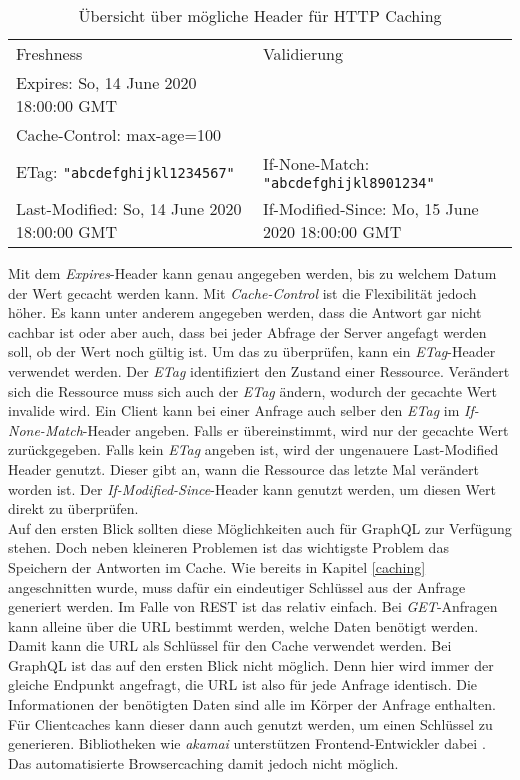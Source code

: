 \begin{table}
\begin{tabular}{p{6cm} p{6cm}}
Freshness & Validierung \\
Expires: So, 14 June 2020 18:00:00 GMT & \\
Cache-Control: max-age=100 &  \\
ETag: \verb+"abcdefghijkl1234567"+ & If-None-Match: \verb+"abcdefghijkl8901234"+\\
Last-Modified: So, 14 June 2020 18:00:00 GMT& If-Modified-Since: Mo, 15 June 2020 18:00:00 GMT\\
\end{tabular}
\caption{Übersicht über mögliche Header für HTTP Caching}
\label{tab:HTTPCaching}
\end{table}

Mit dem \textit{Expires}-Header kann genau angegeben werden, bis zu welchem Datum der Wert gecacht werden kann. Mit \textit{Cache-Control} ist die Flexibilität jedoch höher. Es kann unter anderem angegeben werden, dass die Antwort gar nicht cachbar ist oder aber auch, dass bei jeder Abfrage der Server angefagt werden soll, ob der Wert noch gültig ist. Um das zu überprüfen, kann ein \textit{ETag}-Header verwendet werden. Der \textit{ETag} identifiziert den Zustand einer Ressource. Verändert sich die Ressource muss sich auch der \textit{ETag} ändern, wodurch der gecachte Wert invalide wird. Ein Client kann bei einer Anfrage auch selber den \textit{ETag} im \textit{If-None-Match}-Header angeben. Falls er übereinstimmt, wird nur der gecachte Wert zurückgegeben. Falls kein \textit{ETag} angeben ist, wird der ungenauere Last-Modified Header genutzt. Dieser gibt an, wann die Ressource das letzte Mal verändert worden ist. Der \textit{If-Modified-Since}-Header kann genutzt werden, um diesen Wert direkt zu überprüfen.\\
Auf den ersten Blick sollten diese Möglichkeiten auch für GraphQL zur Verfügung stehen. Doch neben kleineren Problemen ist das wichtigste Problem das Speichern der Antworten im Cache. Wie bereits in Kapitel \ref{caching} angeschnitten wurde, muss dafür ein eindeutiger Schlüssel aus der Anfrage generiert werden. Im Falle von \ac{REST} ist das relativ einfach. Bei \textit{GET}-Anfragen kann alleine über die \ac{URL} bestimmt werden, welche Daten benötigt werden. Damit kann die \ac{URL} als Schlüssel für den Cache verwendet werden. Bei GraphQL ist das auf den ersten Blick nicht möglich. Denn hier wird immer der gleiche Endpunkt angefragt, die \ac{URL} ist also für jede Anfrage identisch. Die Informationen der benötigten Daten sind alle im Körper der Anfrage enthalten. Für Clientcaches kann dieser dann auch genutzt werden, um einen Schlüssel zu generieren. Bibliotheken wie \textit{akamai} unterstützen Frontend-Entwickler dabei \parencite{Akamai2020}. Das automatisierte Browsercaching damit jedoch nicht möglich.\\
